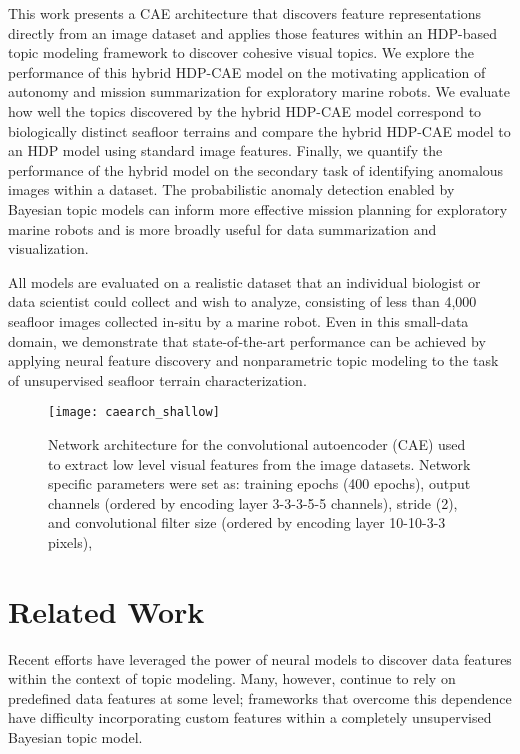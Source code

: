 \documentclass[letterpaper, 10 pt, conference]{ieeeconf}
\begin{document}
This work presents a CAE architecture that discovers feature representations directly from an image dataset and applies those features within an HDP-based topic modeling framework to discover cohesive visual topics.  We explore the performance of this hybrid HDP-CAE model on the motivating application of autonomy and mission summarization for exploratory marine robots. We evaluate how well the topics discovered by the hybrid HDP-CAE model correspond to biologically distinct seafloor terrains and compare the hybrid HDP-CAE model to an HDP model using standard image features. Finally, we quantify the performance of the hybrid model on the secondary task of identifying anomalous images within a dataset. The probabilistic anomaly detection enabled by Bayesian topic models can inform more effective mission planning for exploratory marine robots and is more broadly useful for data summarization and visualization. 

All models are evaluated on a realistic dataset that an individual biologist or data scientist could collect and wish to analyze, consisting of less than 4,000 seafloor images collected in-situ by a marine robot. Even in this small-data domain, we demonstrate that state-of-the-art performance can be achieved by applying neural feature discovery and nonparametric topic modeling to the task of unsupervised seafloor terrain characterization.


\begin{figure*}[thb!]
    \centering
    \texttt{[image: caearch\_shallow]}
    \caption{Network architecture for the convolutional autoencoder (CAE) used to extract low level visual features from the image datasets. Network specific parameters were set as: training epochs (400 epochs), output channels (ordered by encoding layer 3-3-3-5-5 channels), stride (2), and convolutional filter size (ordered by encoding layer 10-10-3-3 pixels),}
    \label{fig:arch}
\end{figure*}

\section{Related Work}
Recent efforts have leveraged the power of neural models to discover data features within the context of topic modeling. Many, however, continue to rely on predefined data features at some level; frameworks that overcome this dependence have difficulty incorporating custom features within a completely unsupervised Bayesian topic model.
\end{document}
